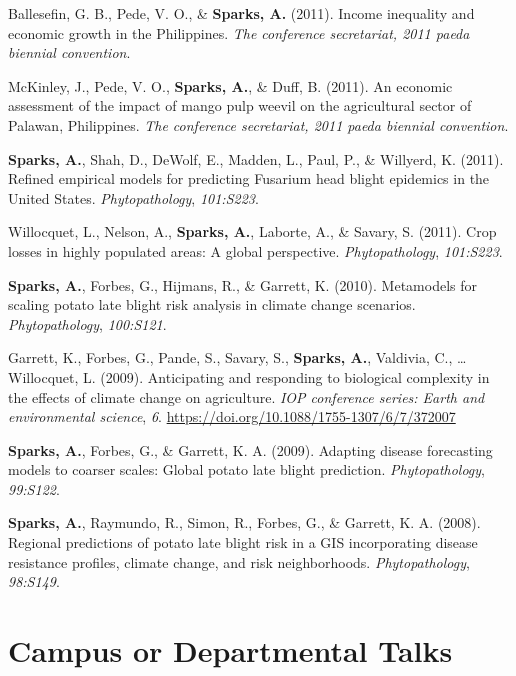 \documentclass[11pt, a4paper]{awesome-cv}
\begin{document}
\leavevmode\hypertarget{ref-Ballesefin2011}{}%
Ballesefin, G. B., Pede, V. O., \& \textbf{Sparks, A.} (2011). Income inequality and economic growth in the Philippines. \emph{The conference secretariat, 2011 paeda biennial convention}.

\leavevmode\hypertarget{ref-McKinley2011}{}%
McKinley, J., Pede, V. O., \textbf{Sparks, A.}, \& Duff, B. (2011). An economic assessment of the impact of mango pulp weevil on the agricultural sector of Palawan, Philippines. \emph{The conference secretariat, 2011 paeda biennial convention}.

\leavevmode\hypertarget{ref-Sparks2011a}{}%
\textbf{Sparks, A.}, Shah, D., DeWolf, E., Madden, L., Paul, P., \& Willyerd, K. (2011). Refined empirical models for predicting Fusarium head blight epidemics in the United States. \emph{Phytopathology}, \emph{101:S223}.

\leavevmode\hypertarget{ref-Willocquet2011}{}%
Willocquet, L., Nelson, A., \textbf{Sparks, A.}, Laborte, A., \& Savary, S. (2011). Crop losses in highly populated areas: A global perspective. \emph{Phytopathology}, \emph{101:S223}.

\leavevmode\hypertarget{ref-Sparks2010}{}%
\textbf{Sparks, A.}, Forbes, G., Hijmans, R., \& Garrett, K. (2010). Metamodels for scaling potato late blight risk analysis in climate change scenarios. \emph{Phytopathology}, \emph{100:S121}.

\leavevmode\hypertarget{ref-Garrett2009}{}%
Garrett, K., Forbes, G., Pande, S., Savary, S., \textbf{Sparks, A.}, Valdivia, C., \ldots{} Willocquet, L. (2009). Anticipating and responding to biological complexity in the effects of climate change on agriculture. \emph{IOP conference series: Earth and environmental science}, \emph{6}. \url{https://doi.org/10.1088/1755-1307/6/7/372007}

\leavevmode\hypertarget{ref-Sparks2009}{}%
\textbf{Sparks, A.}, Forbes, G., \& Garrett, K. A. (2009). Adapting disease forecasting models to coarser scales: Global potato late blight prediction. \emph{Phytopathology}, \emph{99:S122}.

\leavevmode\hypertarget{ref-Sparks2008b}{}%
\textbf{Sparks, A.}, Raymundo, R., Simon, R., Forbes, G., \& Garrett, K. A. (2008). Regional predictions of potato late blight risk in a GIS incorporating disease resistance profiles, climate change, and risk neighborhoods. \emph{Phytopathology}, \emph{98:S149}.

\endgroup

\hypertarget{campus-or-departmental-talks}{%
\section{Campus or Departmental Talks}\label{campus-or-departmental-talks}}
\end{document}
